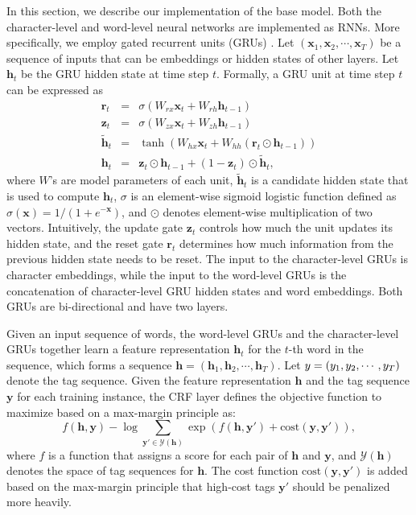 \documentclass{article} \usepackage{iclr2017_conference,times}
\begin{document}
In this section, we describe our implementation of the base model. Both the character-level and word-level neural networks are implemented as RNNs. More specifically, we employ gated recurrent units (GRUs) \citep{cho2014properties}. Let $(\mathbf{x}_1, \mathbf{x}_2, \cdots, \mathbf{x}_T)$ be a sequence of inputs that can be embeddings or hidden states of other layers. Let $\mathbf{h}_t$ be the GRU hidden state at time step $t$. Formally, a GRU unit at time step $t$ can be expressed as
\begin{eqnarray*}
\mathbf{r}_t &=& \sigma(W_{rx} \mathbf{x}_t + W_{rh} \mathbf{h}_{t - 1}) \\
\mathbf{z}_t &=& \sigma(W_{zx} \mathbf{x}_t + W_{zh} \mathbf{h}_{t - 1}) \\
\tilde{\mathbf{h}}_t &=& \tanh(W_{hx} \mathbf{x}_t + W_{hh} (\mathbf{r}_t \odot \mathbf{h}_{t - 1})) \\
\mathbf{h}_t &=& \mathbf{z}_t \odot \mathbf{h}_{t- 1} + (1 - \mathbf{z}_t) \odot \tilde{\mathbf{h}}_t,
\end{eqnarray*}
where $W$'s are model parameters of each unit, $\tilde{\mathbf{h}}_t$ is a candidate hidden state that is used to compute $\mathbf{h}_t$, $\sigma$ is an element-wise sigmoid logistic function defined as $\sigma(\mathbf{x}) = 1 / (1 + e^{- \mathbf{x}})$, and $\odot$ denotes element-wise multiplication of two vectors. Intuitively, the update gate $\mathbf{z}_t$ controls how much the unit updates its hidden state, and the reset gate $\mathbf{r}_t$ determines how much information from the previous hidden state needs to be reset. The input to the character-level GRUs is character embeddings, while the input to the word-level GRUs is the concatenation of character-level GRU hidden states and word embeddings. Both GRUs are bi-directional and have two layers.

Given an input sequence of words, the word-level GRUs and the character-level GRUs together learn a feature representation $\mathbf{h}_t$ for the $t$-th word in the sequence, which forms a sequence $\mathbf{h} = (\mathbf{h}_1, \mathbf{h}_2, \cdots, \mathbf{h}_T)$. Let $\mathbf\mathbf{y} = (y_1, y_2, \cdots, y_T)$ denote the tag sequence. Given the feature representation $\mathbf{h}$ and the tag sequence $\mathbf{y}$ for each training instance, the CRF layer defines the objective function to maximize based on a max-margin principle \citep{gimpel2010softmax} as:
\[
f(\mathbf{h}, \mathbf{y}) - \log \sum_{\mathbf{y}' \in \mathcal{Y}(\mathbf{h})} \exp (f(\mathbf{h}, \mathbf{y}') + \mbox{cost} (\mathbf{y}, \mathbf{y}')),
\]
where $f$ is a function that assigns a score for each pair of $\mathbf{h}$ and $\mathbf{y}$, and $\mathcal{Y}(\mathbf{h})$ denotes the space of tag sequences for $\mathbf{h}$. The cost function $\mbox{cost}(\mathbf{y}, \mathbf{y}')$ is added based on the max-margin principle \citep{gimpel2010softmax} that high-cost tags $\mathbf{y}'$ should be penalized more heavily.
\end{document}
